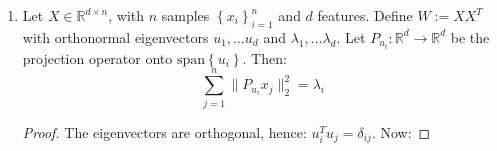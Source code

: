 \documentclass{article}
\begin{document}
\begin{enumerate}[label=\textbf{\large\arabic*)}]
\begin{proof}
 Since $C$ is PSD, it has an orthonormal eigenbasis $\left\{ v_i \right\}_{i=1}^{n}$, and we can write:
    \[
      C = \sum_{i=1}^{n} \lambda_i v_i  v_i ^{T}
    \]
   since $C$ is PSD, we have that $\lambda_i \geq 0$ for all $i$.  
    Let $u = \sum_{i=1}^{n} a_i v_i$ be a unit vector (such a representation exists and is unique because the eigenvectors form a basis). Then:
\begin{align*}
      u ^{T} C u &= u ^{T} \big( C \sum_{i=1}^{n} a_i v_i \big) = u ^{T} \big( \sum_{j=1}^{n} \lambda_j v_j v_j ^{T} (\sum_{i=1}^{n} a_i v_i) \big)  \\
      &= u ^{T} \big( \sum_{j=1}^{n}  \lambda_j v_j \langle v_j, \sum_{i=1}^{n} a_i v_i \rangle \big) 
       = u ^{T} \big( \sum_{j=1}^{n} \lambda_j a_{j} v_j  \big) \tag{$v_i ^{T} v_j = \delta_{ij}$} \\
      &= (\sum_{i=1}^{n} a_i v_i)^{T} \big( \sum_{j=1}^{n} a_j \lambda_j v_j \big) 
      = \sum_{i=1}^{n} a_i \langle v_i, \sum_{j=1}^{n} a_j \lambda_j v_j \rangle \\
      &= \sum_{i=1}^{n} a_i a_i \lambda_i   \tag{ $v_i ^{T} v_j = \delta_{ij}$} \\
      & \leq \sum_{i=1}^{n} a_i ^2 \lambda_1  \tag{$\lambda_1$ is largest } \\
      &= \lambda_1 \lVert u \rVert  ^2  
      = \lambda_1 \tag{ $\lVert u \rVert ^2 = 1$} 
    \end{align*}
   so for every $u \in \mathbb{R}^{n}$, $u ^{T} C u \leq \lambda_1$
  and in particular:
  \begin{align*}
    v_1 ^{T} C v_1 = v_1 ^{T} \lambda_1 v_1 = \lambda_1 \lVert v_1 \rVert ^2 = \lambda_1
  \end{align*}
  i.e. the maximum is achieved by $v_1$, hence $v_1$ maximizes $\text{Var}(Su)$. 
    
  \end{proof}


  \item 
\begin{claim}
  Let $X \in \mathbb{R}^{d \times n}$, with $n$ samples $\left\{ x_i \right\}_{i=1}^{n}$ and $d$ features.  Define $W := X X ^{T}$ with orthonormal eigenvectors $u_1, \ldots u_{d}$ and $\lambda_1, \ldots \lambda_{d}$. Let $P_{u_i}: \mathbb{R}^{d} \to \mathbb{R}^{d}$ be the projection operator onto $\text{span} \left\{ u_i \right\}$. 
  Then:
  \[
    \sum_{j=1}^{n} \lVert P_{u_i} x_j \rVert ^2_2 = \lambda_{i}
  \]
\end{claim}
\begin{proof}
The eigenvectors are orthogonal, hence: $u_i^{T} u_j = \delta_{ij}$. Now:


\end{proof}
\end{enumerate}
\end{document}
